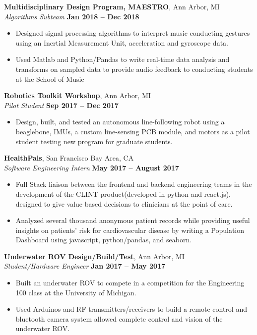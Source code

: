 \documentclass[margin,line]{resume}
\begin{document}
\begin{resume}
    \textbf{Multidisciplinary Design Program, MAESTRO}, Ann Arbor, MI \vspace{2mm}\\\vspace{1mm}%
    \textsl{Algorithms Subteam} \hfill \textbf{Jan 2018 -- Dec 2018}
    \begin{itemize}
    	\item Designed signal processing algorithms to interpret music conducting gestures using an Inertial Measurement Unit, acceleration and gyroscope data.
    	\item Used Matlab and Python/Pandas to write real-time data analysis and transforms on sampled data to provide audio feedback to conducting students at the School of Music
    \end{itemize}
    
    
    \textbf{Robotics Toolkit Workshop}, Ann Arbor, MI \vspace{2mm}\\\vspace{1mm}%
    \textsl{Pilot Student} \hfill \textbf{Sep 2017 -- Dec 2017}
    \begin{itemize}
    	\item Design, built, and tested an autonomous line-following robot using a beaglebone, IMUs, a custom line-sensing PCB module, and motors as a pilot student testing new program for graduate students.
    \end{itemize}
    	
	\textbf{HealthPals}, San Francisco Bay Area, CA \vspace{2mm}\\\vspace{1mm}%
	\textsl{Software Engineering Intern} \hfill \textbf{May 2017 -- August 2017}
	\begin{itemize}
		\item Full Stack liaison between the frontend and backend engineering teams in the development of the CLINT product(developed in python and react.js), designed to give value based decisions to clinicians at the point of care.
		\item Analyzed several thousand anonymous patient records while providing useful insights on patients' risk for cardiovascular disease by writing a Population Dashboard using javascript, python/pandas, and seaborn.
	\end{itemize}




\iffalse

\textbf{Underwater ROV Design/Build/Test}, Ann Arbor, MI \vspace{2mm}\\\vspace{1mm}%
\textsl{Student/Hardware Engineer} \hfill \textbf{Jan 2017 -- May 2017}
\begin{itemize}
	\item Built an underwater ROV to compete in a competition for the Engineering 100 class at the University of Michigan.
	\item Used Arduinos and RF transmitters/receivers to build a remote control and bluetooth camera system allowed complete control and vision of the underwater ROV.
	


\end{itemize}
\end{resume}
\end{document}
